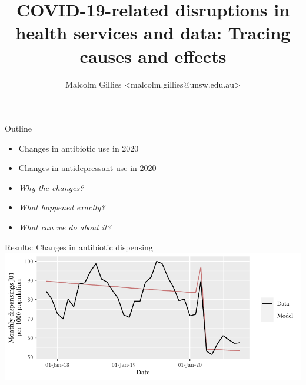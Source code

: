 \documentclass[aspectratio=169,12pt]{beamer} %
\title{COVID-19-related disruptions in health services and data: Tracing causes and effects}
\author{Malcolm Gillies <malcolm.gillies@unsw.edu.au>}
\institute{27 April 2023}
\begin{document}

{
  \begin{frame}[plain]
    \titlepage
  \end{frame}
}

\begin{frame}{Outline}
	\begin{itemize}
		\item Changes in antibiotic use in 2020
		\item Changes in antidepressant use in 2020
		\item \emph{Why the changes?}
		\item \emph{What happened exactly?}
		\item \emph{What can we do about it?}
	\end{itemize}
\end{frame}

\begin{frame}{Results: Changes in antibiotic dispensing}
\centering
\includegraphics{ref/latex-j01armap3-1.pdf}
\end{frame}
\end{document}
